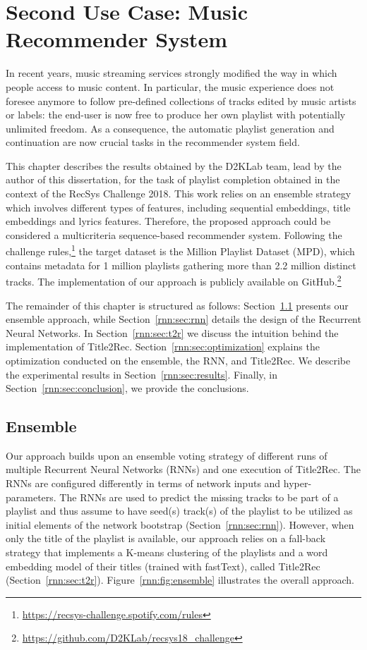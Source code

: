 \chapter{Second Use Case: Music Recommender System}
\graphicspath{{Chapter09/Figures/}}
\label{chap:challenge}

In recent years, music streaming services strongly modified the way in which people access to music content. In particular, the music experience does not foresee anymore to follow pre-defined collections of tracks edited by music artists or labels: the end-user is now free to produce her own playlist with potentially unlimited freedom. As a consequence, the automatic playlist generation and continuation are now crucial tasks in the recommender system field.

This chapter describes the results obtained by the D2KLab team, lead by the author of this dissertation, for the task of playlist completion obtained in the context of the RecSys Challenge 2018. This work relies on an ensemble strategy which involves different types of features, including sequential embeddings, title embeddings and lyrics features. Therefore, the proposed approach could be considered a multicriteria sequence-based recommender system. Following the challenge rules,\footnote{\url{https://recsys-challenge.spotify.com/rules}} the target dataset is the Million Playlist Dataset (MPD), which contains metadata for 1 million playlists gathering more than 2.2 million distinct tracks. The implementation of our approach is publicly available on GitHub.\footnote{\url{https://github.com/D2KLab/recsys18_challenge}}

The remainder of this chapter is structured as follows: Section~\ref{rnn:sec:ensemble} presents our ensemble approach, while Section~\ref{rnn:sec:rnn} details the design of the Recurrent Neural Networks. In Section~\ref{rnn:sec:t2r} we discuss the intuition behind the implementation of Title2Rec. Section~\ref{rnn:sec:optimization} explains the optimization conducted on the ensemble, the RNN, and Title2Rec. We describe the experimental results in Section~\ref{rnn:sec:results}. Finally, in Section~\ref{rnn:sec:conclusion}, we provide the conclusions.

\section{Ensemble}
\label{rnn:sec:ensemble}

Our approach builds upon an ensemble voting strategy of different runs of multiple Recurrent Neural Networks (RNNs) and one execution of Title2Rec. The RNNs are configured differently in terms of network inputs and hyper-parameters. The RNNs are used to predict the missing tracks to be part of a playlist and thus assume to have seed(s) track(s) of the playlist to be utilized as initial elements of the network bootstrap (Section~\ref{rnn:sec:rnn}). However, when only the title of the playlist is available, our approach relies on a fall-back strategy that implements a K-means clustering of the playlists and a word embedding model of their titles (trained with fastText), called Title2Rec (Section~\ref{rnn:sec:t2r}). Figure~\ref{rnn:fig:ensemble} illustrates the overall approach.

